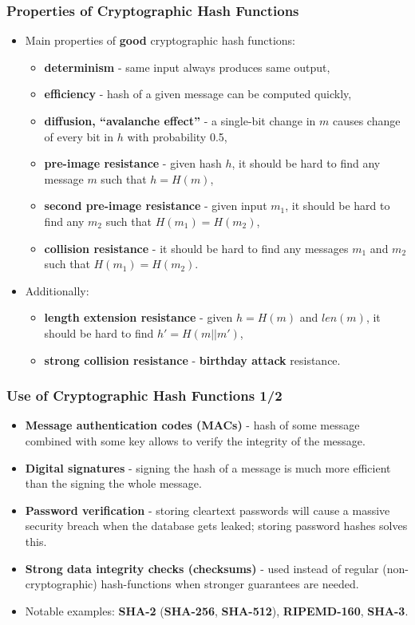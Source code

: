 \documentclass{beamer}
\begin{document}
\begin{frame}
  \frametitle{Properties of Cryptographic Hash Functions}
  \begin{itemize}
  \item Main properties of \textbf{good} cryptographic hash functions:
    \begin{itemize}
    \item \textbf{determinism} - same input always produces same output,
    \item \textbf{efficiency} - hash of a given message can be computed quickly,
    \item \textbf{diffusion, ``avalanche effect''} - a single-bit change in $m$
      causes change of every bit in $h$ with probability 0.5,
    \item \textbf{pre-image resistance} - given hash $h$, it should be hard to
      find any message $m$ such that $h = H(m)$,
    \item \textbf{second pre-image resistance} - given input $m_1$, it should be
      hard to find any $m_2$ such that $H(m_1) = H(m_2)$,
    \item \textbf{collision resistance} - it should be hard to find any messages
      $m_1$ and $m_2$ such that $H(m_1) = H(m_2)$.
    \end{itemize}
  \item Additionally:
    \begin{itemize}
    \item \textbf{length extension resistance} - given $h = H(m)$ and
      $len(m)$, it should be hard to find $h' = H(m || m')$,
    \item \textbf{strong collision resistance} - \textbf{birthday attack}
      resistance.
    \end{itemize}
  \end{itemize}
\end{frame}

\begin{frame}
  \frametitle{Use of Cryptographic Hash Functions 1/2}
  \begin{itemize}
  \item \textbf{Message authentication codes (MACs)} - hash of some message
    combined with some key allows to verify the integrity of the message.
  \item \textbf{Digital signatures} - signing the hash of a message is much
    more efficient than the signing the whole message.
  \item \textbf{Password verification} - storing cleartext passwords will cause
    a massive security breach when the database gets leaked; storing password
    hashes solves this.
  \item \textbf{Strong data integrity checks (checksums)} - used instead of
    regular (non-cryptographic) hash-functions when stronger guarantees are
    needed.
  \item Notable examples: \textbf{SHA-2} (\textbf{SHA-256}, \textbf{SHA-512}),
    \textbf{RIPEMD-160}, \textbf{SHA-3}.
  \end{itemize}
\end{frame}
\end{document}
